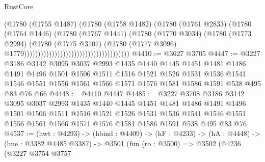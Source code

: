 \begin{lexlean}{RustCore}
\begin{coremodule}
                                                              (@1780
                                                                (@1755 @1487)
                                                                (@1780
                                                                  (@1758 @1482)
                                                                  (@1780
                                                                    (@1761 @2833)
                                                                    (@1780
                                                                      (@1764 @1446)
                                                                      (@1780
                                                                        (@1767 @1441)
                                                                        (@1780
                                                                          (@1770 @3034)
                                                                          (@1780
                                                                            (@1773 @2994)
                                                                            (@1780
                                                                              (@1775 @3107)
                                                                              (@1780
                                                                                (@1777 @3096)
                                                                                @1779))))))))))))))))))))))))))))))))))))))
@4410 := @3627 @3705
@4447 := @3227
    @3186
    @3142
    @3095
    @3037
    @2993
    @1435
    @1440
    @1445
    @1451
    @1481
    @1486
    @1491
    @1496
    @1501
    @1506
    @1511
    @1516
    @1521
    @1526
    @1531
    @1536
    @1541
    @1546
    @1551
    @1556
    @1561
    @1566
    @1571
    @1576
    @1581
    @1586
    @1591
    @538
    @495
    @83
    @76
    @66
@4448 := @4410 @4447
@4485 := @3227
    @3708
    @3186
    @3142
    @3095
    @3037
    @2993
    @1435
    @1440
    @1445
    @1451
    @1481
    @1486
    @1491
    @1496
    @1501
    @1506
    @1511
    @1516
    @1521
    @1526
    @1531
    @1536
    @1541
    @1546
    @1551
    @1556
    @1561
    @1566
    @1571
    @1576
    @1581
    @1586
    @1591
    @538
    @495
    @83
    @76
@4537 := (hwt : @4293) ->
  (hbind : @4409) ->
  (hF : @4233) ->
  (hA : @4448) ->
  (hne : @3382 @4485 @3387) ->
  @3501
    (fun (ro : @3500) =>
    @3502
      (@4236
        (@3227
          @3754
          @3757

\end{coremodule}
\end{lexlean}
